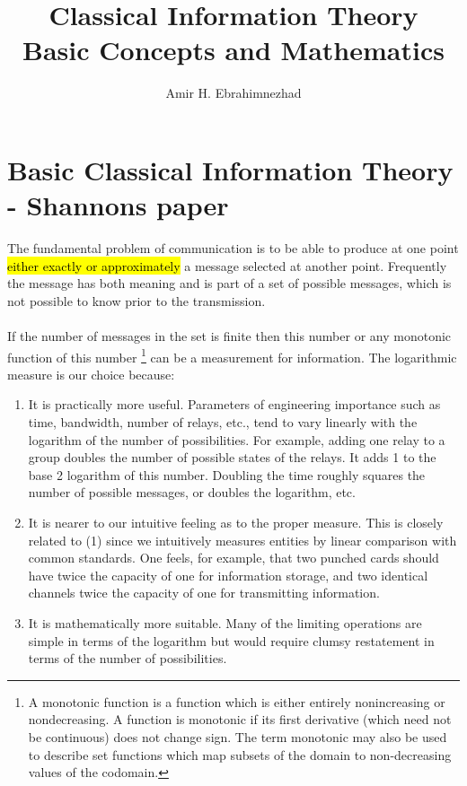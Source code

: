 \documentclass[10pt,a4paper]{article}
\title{Classical Information Theory \\ \large Basic Concepts and Mathematics}
\author{Amir H. Ebrahimnezhad}
\newcommand{\hldl}[1]{%
	\sethlcolor{lightdarkliver}%
	\hl{#1}
}
\begin{document}
     \maketitle
     \section{Basic Classical Information Theory - Shannons paper}
        \indent The fundamental problem of communication is to be able to produce at one point \hldl{either exactly or approximately} a message selected at another point. Frequently the message has both meaning and is part of a set of possible messages, which is not possible to know prior to the transmission.
        \\
        \\
        \indent If the number of messages in the set is finite then this number or any monotonic function of this number \footnote{A monotonic function is a function which is either entirely nonincreasing or nondecreasing. A function is monotonic if its first derivative (which need not be continuous) does not change sign. The term monotonic may also be used to describe set functions which map subsets of the domain to non-decreasing values of the codomain.} can be  a measurement for information. The logarithmic measure is our choice because:
        \begin{enumerate}
            \item It is practically more useful. Parameters of engineering importance such as time, bandwidth, number of relays, etc., tend to vary linearly with the logarithm of the number of possibilities. For example, adding one relay to a group doubles the number of possible states of the relays. It adds 1 to the base 2 logarithm of this number. Doubling the time roughly squares the number of possible messages, or doubles the logarithm, etc.
            \item  It is nearer to our intuitive feeling as to the proper measure. This is closely related to (1) since we intuitively measures entities by linear comparison with common standards. One feels, for example, that two punched cards should have twice the capacity of one for information storage, and two identical channels twice the capacity of one for transmitting information.
            \item It is mathematically more suitable. Many of the limiting operations are simple in terms of the logarithm but would require clumsy restatement in terms of the number of possibilities.
        \end{enumerate}
\end{document}
